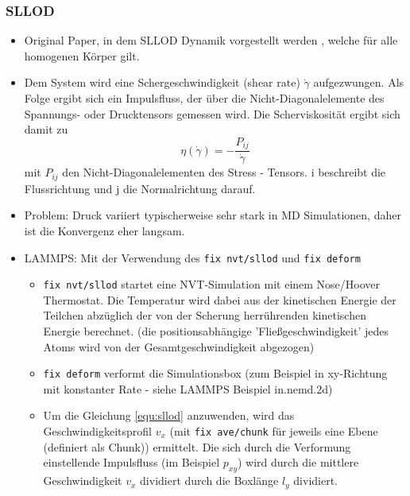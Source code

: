 \documentclass[a4paper, 10pt, 
               numbers=noenddot, toc=graduated,
               headsepline=true, footsepline=true,
               twoside=false, titlepage=true, 
               bibliography=totoc]{scrartcl}
\begin{document}
	\subsubsection{SLLOD}
		\begin{itemize}
		 	\item Original Paper, in dem SLLOD Dynamik vorgestellt werden \cite{Evans1984}, welche für alle homogenen Körper gilt.
		 	\item Dem System wird eine Schergeschwindigkeit (shear rate) $\dot{\gamma}$ aufgezwungen. Als Folge ergibt sich ein Impulsfluss, der über die Nicht-Diagonalelemente des Spannungs- oder Drucktensors gemessen wird\cite{Tenney2010}. Die Scherviskosität ergibt sich damit zu 
				\begin{equation}
					\eta\left(\dot{\gamma}\right) = - \frac{P_{ij}}{\dot{\gamma}}
					\label{equ:sllod}
				\end{equation}
 mit $P_{ij}$ den Nicht-Diagonalelementen des Stress - Tensors. i beschreibt die Flussrichtung und j die Normalrichtung darauf. 
		 	\item Problem: Druck variiert typischerweise sehr stark in MD Simulationen, daher ist die Konvergenz eher langsam\cite{Tenney2010}.
		 	\item LAMMPS: Mit der Verwendung des \texttt{fix nvt/sllod} und \texttt{fix deform} 
				\begin{itemize}
					\item \texttt{fix nvt/sllod} startet eine NVT-Simulation mit einem Nose/Hoover Thermostat. Die Temperatur wird dabei aus der kinetischen Energie der Teilchen abzüglich der von der Scherung herrührenden kinetischen Energie berechnet. (die positionsabhängige 'Fließgeschwindigkeit' jedes Atoms wird von der Gesamtgeschwindigkeit abgezogen)
					\item \texttt{fix deform} verformt die Simulationsbox (zum Beispiel in xy-Richtung mit konstanter Rate - siehe LAMMPS Beispiel in.nemd.2d)
					\item Um die Gleichung \ref{equ:sllod} anzuwenden, wird das Geschwindigkeitsprofil $v_x$ (mit \texttt{fix ave/chunk} für jeweils eine Ebene (definiert als Chunk)) ermittelt. Die sich durch die Verformung einstellende Impulsfluss (im Beispiel $p_{xy}$) wird durch die mittlere Geschwindigkeit $v_x$ dividiert durch die Boxlänge $l_y$ dividiert.
				\end{itemize}
		\end{itemize}
		
\end{document}
